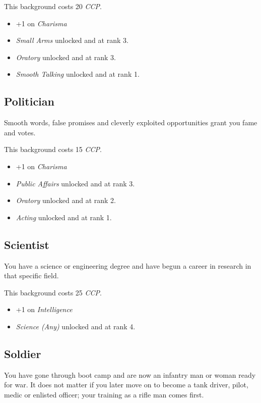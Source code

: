 This background costs 20 \emph{CCP}.

\begin{itemize}
\item +1 on \emph{Charisma}
\item \emph{Small Arms} unlocked and at rank 3.
\item \emph{Oratory} unlocked and at rank 3.
\item \emph{Smooth Talking} unlocked and at rank 1.
\end{itemize}

\subsection{Politician}

Smooth words, false promises and cleverly exploited opportunities grant you fame
and votes.

This background costs 15 \emph{CCP}.

\begin{itemize}
\item +1 on \emph{Charisma}
\item \emph{Public Affairs} unlocked and at rank 3.
\item \emph{Oratory} unlocked and at rank 2.
\item \emph{Acting} unlocked and at rank 1.
\end{itemize}

\subsection{Scientist}

You have a science or engineering degree and have begun a career in research in
that specific field.

This background costs 25 \emph{CCP}.

\begin{itemize}
\item +1 on \emph{Intelligence}
\item \emph{Science (Any)} unlocked and at rank 4.
\end{itemize}

\subsection{Soldier}

You have gone through boot camp and are now an infantry man or woman ready for
war. It does not matter if you later move on to become a tank driver, pilot,
medic or enlisted officer; your training as a rifle man comes first.


